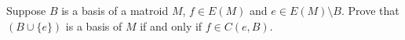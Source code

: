\prob
{
    Suppose $B$ is a basis of a matroid $M$, $f \in E(M)$ and $e \in E(M) \setminus B$.
    Prove that $(B\cup \{e\})$ is a basis of $M$ if and only if $f \in C(e, B)$.
}
